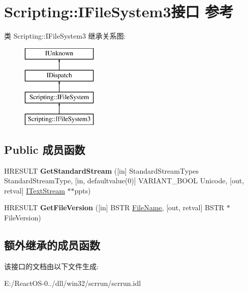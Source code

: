 \hypertarget{interface_scripting_1_1_i_file_system3}{}\section{Scripting\+:\+:I\+File\+System3接口 参考}
\label{interface_scripting_1_1_i_file_system3}
类 Scripting\+:\+:I\+File\+System3 继承关系图\+:\begin{figure}[H]
\begin{center}
\leavevmode
\includegraphics[height=4.000000cm]{interface_scripting_1_1_i_file_system3}
\end{center}
\end{figure}
\subsection*{Public 成员函数}
\begin{DoxyCompactItemize}
\item 
\mbox{\label{interface_scripting_1_1_i_file_system3_a575d724c3e766662797d19086bd9e8c0}} 
H\+R\+E\+S\+U\+LT {\bfseries Get\+Standard\+Stream} (\mbox{[}in\mbox{]} Standard\+Stream\+Types Standard\+Stream\+Type, \mbox{[}in, defaultvalue(0)\mbox{]} V\+A\+R\+I\+A\+N\+T\+\_\+\+B\+O\+OL Unicode, \mbox{[}out, retval\mbox{]} \hyperlink{interface_scripting_1_1_i_text_stream}{I\+Text\+Stream} $\ast$$\ast$ppts)
\item 
\mbox{\label{interface_scripting_1_1_i_file_system3_acca639a3f9bc64fb9337611e10c97bc6}} 
H\+R\+E\+S\+U\+LT {\bfseries Get\+File\+Version} (\mbox{[}in\mbox{]} B\+S\+TR \hyperlink{struct___file_name}{File\+Name}, \mbox{[}out, retval\mbox{]} B\+S\+TR $\ast$File\+Version)
\end{DoxyCompactItemize}
\subsection*{额外继承的成员函数}


该接口的文档由以下文件生成\+:\begin{DoxyCompactItemize}
\item 
E\+:/\+React\+O\+S-\/0../dll/win32/scrrun/scrrun.\+idl\end{DoxyCompactItemize}
